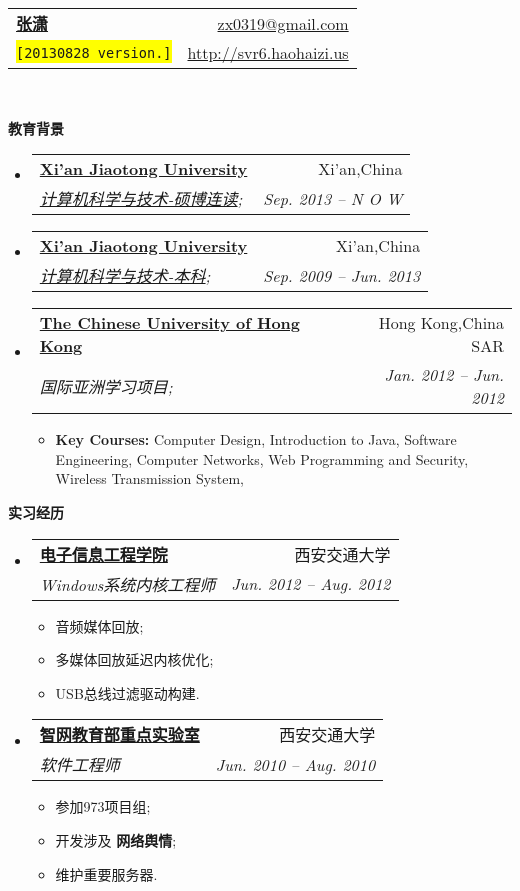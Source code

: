 \documentclass[letterpaper,11pt]{article}
\makeatletter
\newcommand{\resitem}[1]{\item #1 \vspace{-2pt}}
\newcommand{\resheading}[1]{{\large \colorbox{mygrey}{\begin{minipage}{\textwidth}{\textbf{#1 \vphantom{p\^{E}}}}\end{minipage}}}}
\newcommand{\ressubheading}[4]{
\begin{tabular*}{6.5in}{l@{\extracolsep{\fill}}r}
		\textbf{#1} & #2 \\
		\textit{#3} & \textit{#4} \\
\end{tabular*}\vspace{-6pt}}
\makeatother
\begin{document}
\begin{CJK}{UTF8}{gbsn}

\newcommand{\mywebheader}{
\begin{tabular*}{7in}{l@{\extracolsep{\fill}}r}
	\textbf{\href{http://svr6.haohaizi.us/}{\LARGE 张潇}} & \href{mailto:zx0319@gmail.com}{zx0319@gmail.com}\\
	{\footnotesize \texttt{\colorbox{yellow}{[20130828 version.]}}} & \href{http://svr6.haohaizi.us}{http://svr6.haohaizi.us} \\
	\end{tabular*}
\\
\vspace{0.1in}}

\mywebheader

\resheading{教育背景}
	\begin{itemize}
		\item
			\ressubheading{\href{http://www.xjtu.edu.cn}{Xi'an Jiaotong University}}{Xi'an,China}{\href{http://www.cs.xjtu.edu.cn}{计算机科学与技术-硕博连读};}{Sep. 2013 --  N O W }
		\item
			\ressubheading{\href{http://www.xjtu.edu.cn}{Xi'an Jiaotong University}}{Xi'an,China}{\href{http://www.cs.xjtu.edu.cn}{计算机科学与技术-本科};}{Sep. 2009 -- Jun. 2013}
			
		\item
			\ressubheading{\href{http://www.cuhk.edu.hk}{The Chinese University of Hong Kong}}{Hong Kong,China SAR}{{国际亚洲学习项目};}{Jan. 2012 -- Jun. 2012}
				{ \footnotesize
				\begin{itemize}
					\resitem
					{\textbf{Key Courses:}
						{Computer Design},
						{Introduction to Java},
						{Software Engineering},
						{Computer Networks},
						{Web Programming and Security},
						{Wireless Transmission System},
					}
				\end{itemize}
			}
	\end{itemize} %

\resheading{实习经历}
	\begin{itemize}
		\item 
			\ressubheading{\href{http://eie.xjtu.edu.cn/}{电子信息工程学院}}{西安交通大学}{Windows系统内核工程师}{Jun. 2012 -- Aug. 2012}
				{ \footnotesize
				\begin{itemize}
					\resitem{音频媒体回放;}
					\resitem{多媒体回放延迟内核优化;}
					\resitem{USB总线过滤驱动构建.}
				\end{itemize}
				}
		\item 
			\ressubheading{\href{http://nskeylab.xjtu.edu.cn/}{智网教育部重点实验室}}{西安交通大学}{软件工程师}{Jun. 2010 -- Aug. 2010}
				{ \footnotesize
				\begin{itemize}
					\resitem{参加973项目组;}
					\resitem{开发涉及 \textbf{网络舆情};}
					\resitem{维护重要服务器.}
				\end{itemize}
				}
	\end{itemize}
	

\end{CJK}
\end{document}

